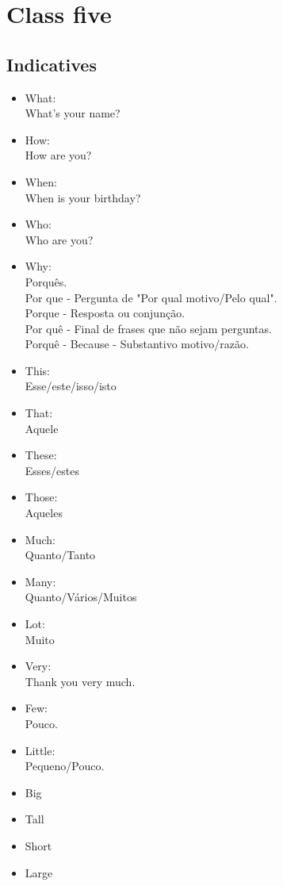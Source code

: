 \documentclass[12pt,a4paper]{article} %
\begin{document}
\section{Class five}
\subsection{Indicatives}
	\begin{itemize}
		\item What:\\ What's your name?
		\item How:\\ How are you?
		\item When:\\ When is your birthday?
		\item Who:\\Who are you?
		\item Why:\\ Porquês.\\
		Por que - Pergunta de "Por qual motivo/Pelo qual".\\
		Porque - Resposta ou conjunção.\\
		Por quê - Final de frases que não sejam perguntas.\\
		Porquê - Because - Substantivo motivo/razão.
		\item This:\\ Esse/este/isso/isto
		\item That:\\ Aquele
		\item These:\\ Esses/estes
		\item Those:\\ Aqueles
		\item Much:\\ Quanto/Tanto
		\item Many:\\ Quanto/Vários/Muitos
		\item Lot:\\ Muito
		\item Very:\\ Thank you very much.
		\item Few:\\ Pouco.
		\item Little:\\ Pequeno/Pouco.
		\item Big
		\item Tall
		\item Short
		\item Large

\end{itemize}
\end{document}
